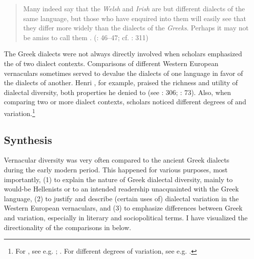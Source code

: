 \begin{quote}
Many indeed say that the \textit{Welsh} and \textit{Irish} are but different dialects of the same language, but those who have enquired into them will easily see that they differ more widely than the dialects of the \textit{Greeks}. Perhaps it may not be amiss to call them . (\citealt{Malcolm1738}: 46–47; cf. \citealt{Macnicol1779}: 311)
\end{quote}

The Greek dialects were not always directly involved when scholars emphasized the  of two dialect contexts. Comparisons of different Western European vernaculars sometimes served to devalue the dialects of one language in favor of the dialects of another. Henri \citet[133--134]{Estienne1579}, for example, praised the richness and utility of  dialectal diversity, both properties he denied to  (see \citealt{Swiggers1997}: 306; \citeyear{Swiggers2009}: 73). Also, when comparing two or more  dialect contexts, scholars noticed different degrees of  and variation.\footnote{For , see e.g. \citet[158\textsc{\textsuperscript{r}}\textsc{–158}\textsc{\textsuperscript{v}}]{Hosius1560}; \citet[77 – I refer to the German translation of the Swedish original, published in 1746/1747]{Hogstrom1748}. For different degrees of variation, see e.g. \citet[27, 57]{Sajnovics1770}.}

\subsection{Synthesis}

Vernacular diversity was very often compared to the ancient Greek dialects during the early modern period. This happened for various purposes, most importantly, (1) to explain the nature of Greek dialectal diversity, mainly to would-be Hellenists or to an intended readership unacquainted with the Greek language, (2) to justify and describe (certain uses of) dialectal variation in the Western European vernaculars, and (3) to emphasize differences between Greek and  variation, especially in literary and sociopolitical terms. I have visualized the directionality of the comparisons in  below.

